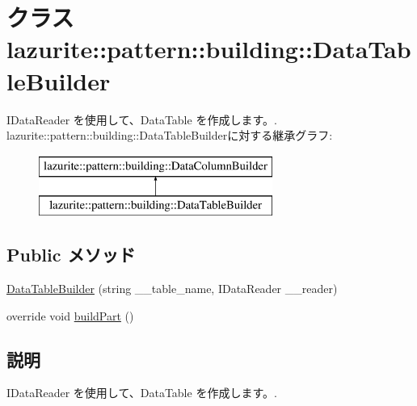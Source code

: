 \hypertarget{classlazurite_1_1pattern_1_1building_1_1_data_table_builder}{
\section{クラス lazurite::pattern::building::DataTableBuilder}
\label{classlazurite_1_1pattern_1_1building_1_1_data_table_builder}
}


IDataReader を使用して、DataTable を作成します。.  
lazurite::pattern::building::DataTableBuilderに対する継承グラフ:\begin{figure}[H]
\begin{center}
\leavevmode
\includegraphics[height=2cm]{classlazurite_1_1pattern_1_1building_1_1_data_table_builder}
\end{center}
\end{figure}
\subsection*{Public メソッド}
\begin{DoxyCompactItemize}
\item 
\hyperlink{classlazurite_1_1pattern_1_1building_1_1_data_table_builder_a2eb9658dec8881dd6fe6d8985cf80ed4}{DataTableBuilder} (string \_\-\_\-table\_\-name, IDataReader \_\-\_\-reader)
\item 
override void \hyperlink{classlazurite_1_1pattern_1_1building_1_1_data_table_builder_a7854fcd46057380db161064c8dc6ce82}{buildPart} ()
\end{DoxyCompactItemize}


\subsection{説明}
IDataReader を使用して、DataTable を作成します。. 

